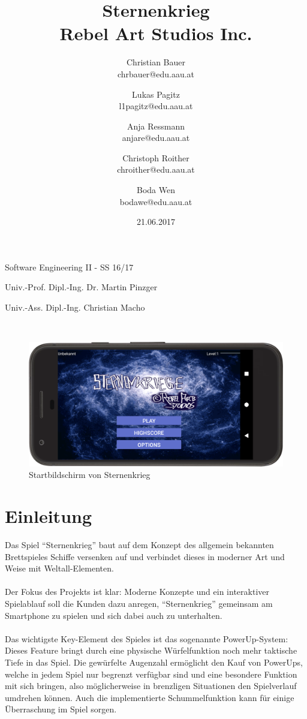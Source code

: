 \documentclass[11pt]{article} %
\title{Sternenkrieg \\\small{Rebel Art Studios Inc.}}
\author{Christian Bauer\\ chrbauer@edu.aau.at
\and Lukas Pagitz \\ l1pagitz@edu.aau.at
\and Anja Ressmann \\ anjare@edu.aau.at
\and Christoph Roither \\ chroither@edu.aau.at
\and Boda Wen \\ bodawe@edu.aau.at}
\date{21.06.2017}
\begin{document}
\maketitle

\begin{center}
Software Engineering II - SS 16/17

\hfill \break

Univ.-Prof. Dipl.-Ing. Dr. Martin Pinzger

Univ.-Ass. Dipl.-Ing. Christian Macho

\hfill \break
\\[3em]
\begin{figure}[H]
	\centering
 	\includegraphics[width=1\textwidth]{img/main}
	\caption{Startbildschirm von Sternenkrieg}
\end{figure}
\end{center}
\hfill \break
\tableofcontents

\newpage

\section{Einleitung}
Das Spiel \enquote{Sternenkrieg} baut auf dem Konzept des allgemein bekannten Brettspieles Schiffe versenken auf und verbindet dieses in moderner Art und Weise mit Weltall-Elementen.
\\\\
Der Fokus des Projekts ist klar: Moderne Konzepte und ein interaktiver Spielablauf soll die Kunden dazu anregen, \enquote{Sternenkrieg} gemeinsam am Smartphone zu spielen und sich dabei auch zu unterhalten.
\\\\
Das wichtigste Key-Element des Spieles ist das sogenannte PowerUp-System: Dieses Feature bringt durch eine physische Würfelfunktion noch mehr taktische Tiefe in das Spiel. Die gewürfelte Augenzahl ermöglicht den Kauf von PowerUps, welche in jedem Spiel nur begrenzt verfügbar sind und eine besondere Funktion mit sich bringen, also möglicherweise in brenzligen Situationen den Spielverlauf umdrehen können. Auch die implementierte Schummelfunktion kann für einige Überraschung im Spiel sorgen.
\end{document}
